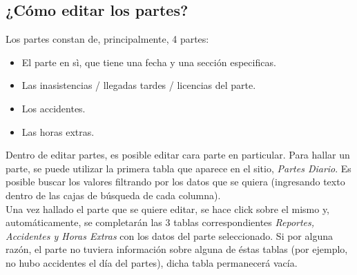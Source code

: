 \documentclass[12pt,a4paper]{article}
\begin{document}
\subsection{¿Cómo editar los partes?}
Los partes constan de, principalmente, 4 partes:
\begin{itemize}
	\item El parte en sì, que tiene una fecha y una sección especificas.
	\item Las inasistencias / llegadas tardes / licencias del parte.
	\item Los accidentes.
	\item Las horas extras.
\end{itemize}
Dentro de editar partes, es posible editar cara parte en particular. Para hallar un parte, se puede utilizar la primera tabla que aparece en el sitio, \textit{Partes Diario}. Es posible buscar los valores filtrando por los datos que se quiera (ingresando texto dentro de las cajas de búsqueda de cada columna).\\
Una vez hallado el parte que se quiere editar, se hace click sobre el mismo y, automáticamente, se completarán las 3 tablas correspondientes \textit{Reportes, Accidentes y Horas Extras} con los datos del parte seleccionado. Si por alguna razón, el parte no tuviera información sobre alguna de éstas tablas (por ejemplo, no hubo accidentes el día del partes), dicha tabla permanecerá vacía.
\end{document}

